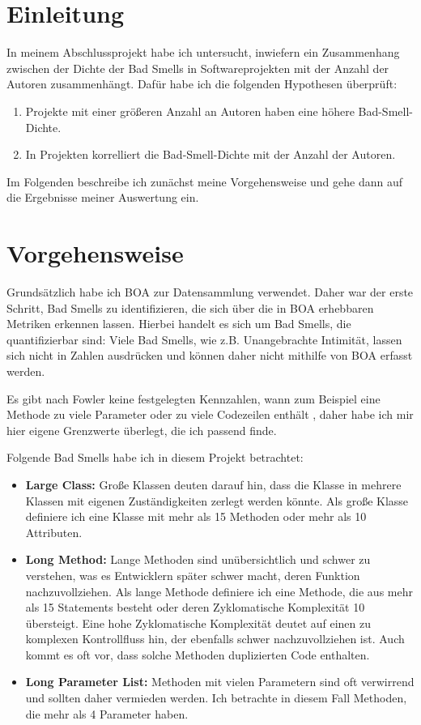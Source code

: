 \documentclass[12pt]{article}
\date{}
\begin{document}
\section{Einleitung}
In meinem Abschlussprojekt habe ich untersucht, inwiefern ein Zusammenhang zwischen der Dichte der Bad Smells in Softwareprojekten mit der Anzahl der Autoren zusammenhängt.
Dafür habe ich die folgenden Hypothesen überprüft:
\begin{enumerate}
	\item Projekte mit einer größeren Anzahl an Autoren haben eine höhere Bad-Smell-Dichte.
	\item In Projekten korrelliert die Bad-Smell-Dichte mit der Anzahl der Autoren.
\end{enumerate}

Im Folgenden beschreibe ich zunächst meine Vorgehensweise und gehe dann auf die Ergebnisse meiner Auswertung ein.

\section{Vorgehensweise}
Grundsätzlich habe ich BOA \cite{boa} zur Datensammlung verwendet.
Daher war der erste Schritt, Bad Smells zu identifizieren, die sich über die in BOA erhebbaren Metriken erkennen lassen.
Hierbei handelt es sich um Bad Smells, die quantifizierbar sind:
Viele Bad Smells, wie z.B. Unangebrachte Intimität, lassen sich nicht in Zahlen ausdrücken und können daher nicht mithilfe von BOA erfasst werden.

Es gibt nach Fowler keine festgelegten Kennzahlen, wann zum Beispiel eine Methode zu viele Parameter oder zu viele Codezeilen enthält \cite{fowler2018refactoring}, daher habe ich mir hier eigene Grenzwerte überlegt, die ich passend finde.

Folgende Bad Smells habe ich in diesem Projekt betrachtet:
\begin{itemize}
	\item \textbf{Large Class:} Große Klassen deuten darauf hin, dass die Klasse in mehrere Klassen mit eigenen Zuständigkeiten zerlegt werden könnte. \cite{fowler2018refactoring}
	Als große Klasse definiere ich eine Klasse mit mehr als 15 Methoden oder mehr als 10 Attributen.
	
	\item \textbf{Long Method:} Lange Methoden sind unübersichtlich und schwer zu verstehen, was es Entwicklern später schwer macht, deren Funktion nachzuvollziehen. \cite{fowler2018refactoring}
	Als lange Methode definiere ich eine Methode, die aus mehr als 15 Statements besteht oder deren Zyklomatische Komplexität 10 übersteigt.
	Eine hohe Zyklomatische Komplexität deutet auf einen zu komplexen Kontrollfluss hin, der ebenfalls schwer nachzuvollziehen ist.
	Auch kommt es oft vor, dass solche Methoden duplizierten Code enthalten. \cite{fowler2018refactoring}
	
	\item \textbf{Long Parameter List:} Methoden mit vielen Parametern sind oft verwirrend und sollten daher vermieden werden. \cite{fowler2018refactoring}
	Ich betrachte in diesem Fall Methoden, die mehr als 4 Parameter haben.
\end{itemize}



\end{document}

